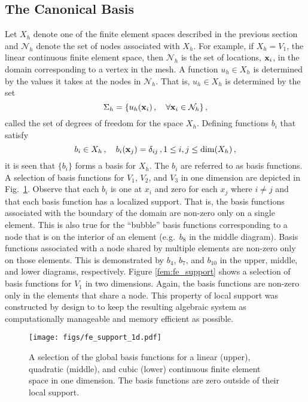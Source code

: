 \documentclass[../doc.tex]{subfiles}
\begin{document}
\subsection{The Canonical Basis}
Let $X_h$ denote one of the finite element spaces described in the previous section and $\mathcal{N}_h$ denote the set of nodes associated with $X_h$. For example, if $X_h = V_1$, the linear continuous finite element space, then $\mathcal{N}_h$ is the set of locations, $\boldsymbol{\mathrm{x}}_i$, in the domain corresponding to a vertex in the mesh. A function $u_h \in X_h$ is determined by the values it takes at the nodes in $\mathcal{N}_h$. That is, $u_h \in X_h$ is determined by the set 
	\begin{equation}
		\Sigma_h = \{ u_h(\boldsymbol{\mathrm{x}}_i)\,, \quad \forall \boldsymbol{\mathrm{x}}_i \in \mathcal{N}_h\} \,, 
	\end{equation}
called the set of degrees of freedom for the space $X_h$. Defining functions $b_i$ that satisfy 
	\begin{equation}
		b_i \in X_h \,, \quad b_i(\boldsymbol{\mathrm{x}}_j) = \delta_{ij}\,, 1 \leq i,j \leq \dim(X_h) \,, 
	\end{equation}
it is seen that $\{b_i\}$ forms a basis for $X_h$. The $b_i$ are referred to as basis functions. A selection of basis functions for $V_1$, $V_2$, and $V_3$ in one dimension are depicted in Fig.~\ref{fem:fe_support_1d}. Observe that each $b_i$ is one at $x_i$ and zero for each $x_j$ where $i\neq j$ and that each basis function has a localized support. That is, the basis functions associated with the boundary of the domain are non-zero only on a single element. This is also true for the ``bubble'' basis functions corresponding to a node that is on the interior of an element (e.g.~$b_8$ in the middle diagram). Basis functions associated with a node shared by multiple elements are non-zero only on those elements. This is demonstrated by $b_4$, $b_7$, and $b_{10}$ in the upper, middle, and lower diagrams, respectively. Figure \ref{fem:fe_support} shows a selection of basis functions for $V_1$ in two dimensions. Again, the basis functions are non-zero only in the elements that share a node. This property of local support was constructed by design to to keep the resulting algebraic system as computationally manageable and memory efficient as possible. 
\begin{figure}
\centering
\texttt{[image: figs/fe\_support\_1d.pdf]}
\caption{A selection of the global basis functions for a linear (upper), quadratic (middle), and cubic (lower) continuous finite element space in one dimension. The basis functions are zero outside of their local support. }
\label{fem:fe_support_1d}
\end{figure}
\end{document}
